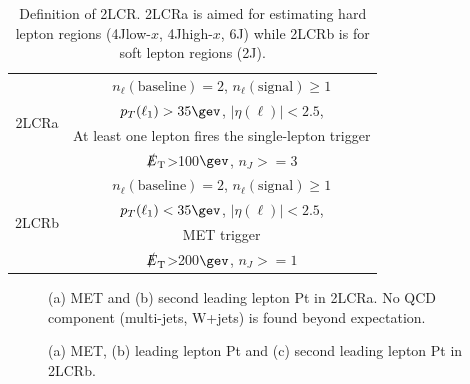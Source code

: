 \begin{table}[h]
  \begin{center}
    \caption{Definition of 2LCR. 2LCRa is aimed for estimating hard lepton regions (4Jlow-$x$, 4Jhigh-$x$, 6J) while 2LCRb is for soft lepton regions (2J).}
    \begin{tabular}{ | c | c | }
      \hline
      \multirow{4}{*}{2LCRa} 
      & $n_{\ell}(\mathrm{baseline})=2$, $n_{\ell}(\mathrm{signal})\ge1$ \\
      & $p_{T}(\ell_{1})>35\gev$, $|\eta(\ell)|<2.5$,  \\
      & At least one lepton fires the single-lepton trigger \\       
      & $\slashed{E}_{\mathrm{T}}$>100$\gev$, $n_J>=3$ \\
      \hline
      \multirow{4}{*}{2LCRb} 
      & $n_{\ell}(\mathrm{baseline})=2$, $n_{\ell}(\mathrm{signal})\ge1$ \\
      & $p_{T}(\ell_{1})<35\gev$, $|\eta(\ell)|<2.5$,  \\
      & MET trigger \\       
      & $\slashed{E}_{\mathrm{T}}$>200$\gev$, $n_J>=1$ \\
      \hline
    \end{tabular}  \label{tab::ObjReplace::method::2LCR}
  \end{center}
\end{table}


\begin{figure}[h]
  \centering
    \caption{(a) MET and (b) second leading lepton Pt in 2LCRa. No QCD component (multi-jets, W+jets) is found beyond expectation. \label{fig::ObjReplace::method::2LCRa}}    
\end{figure}
\begin{figure}[h]
  \centering
    \caption{(a) MET, (b) leading lepton Pt and (c) second leading lepton Pt in 2LCRb.  \label{fig::ObjReplace::method::2LCRb}}    
\end{figure}

